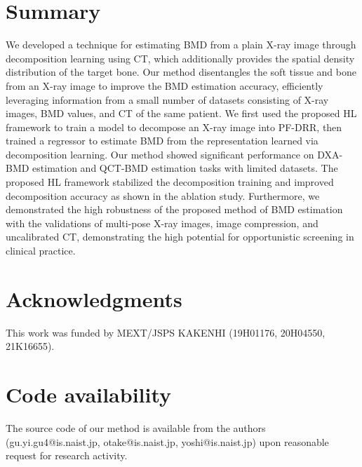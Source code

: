 \documentclass[times,twocolumn,final]{elsarticle}
\begin{document}
\section{Summary}
We developed a technique for estimating BMD from a plain X-ray image through decomposition learning using CT, which additionally provides the spatial density distribution of the target bone.
Our method disentangles the soft tissue and bone from an X-ray image to improve the BMD estimation accuracy, efficiently leveraging information from a small number of datasets consisting of X-ray images, BMD values, and CT of the same patient.
We first used the proposed HL framework to train a model to decompose an X-ray image into PF-DRR, then trained a regressor to estimate BMD from the representation learned via decomposition learning.
Our method showed significant performance on DXA-BMD estimation and QCT-BMD estimation tasks with limited datasets.
The proposed HL framework stabilized the decomposition training and improved decomposition accuracy as shown in the ablation study.
Furthermore, we demonstrated the high robustness of the proposed method of BMD estimation with the validations of multi-pose X-ray images, image compression, and uncalibrated CT, demonstrating the high potential for opportunistic screening in clinical practice.

\section*{Acknowledgments}
This work was funded by MEXT/JSPS KAKENHI (19H01176, 20H04550, 21K16655).

\section*{Code availability}
The source code of our method is available from the authors (gu.yi.gu4@is.naist.jp, otake@is.naist.jp, yoshi@is.naist.jp) upon reasonable request for research activity.


\end{document}
